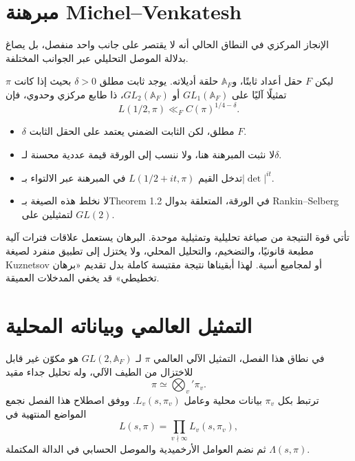 \section{مبرهنة Michel--Venkatesh}

الإنجاز المركزي في النطاق الحالي أنه لا يقتصر على جانب واحد منفصل، بل
يصاغ بدلالة الموصل التحليلي عبر الجوانب المختلفة.

\begin{theorem}
\label{thm:ch21-michel-venkatesh}
ليكن \(F\) حقل أعداد ثابتًا، و\(\mathbb A_F\) حلقة أديلاته. يوجد
ثابت مطلق \(\delta>0\) بحيث إذا كانت \(\pi\) تمثيلًا آليًا على
\(GL_1(\mathbb A_F)\) أو \(GL_2(\mathbb A_F)\)، ذا طابع مركزي
وحدوي، فإن
\[
L(1/2,\pi)
\ll_F
C(\pi)^{1/4-\delta}.
\]
\end{theorem}

\begin{remark}
\begin{itemize}
  \item \(\delta\) مطلق، لكن الثابت الضمني يعتمد على الحقل الثابت
  \(F\).
  \item لا نثبت المبرهنة هنا، ولا ننسب إلى الورقة قيمة عددية محسنة
  لـ\(\delta\).
  \item تدخل القيم \(L(1/2+it,\pi)\) في المبرهنة عبر الالتواء
  بـ\(|\det|^{it}\).
  \item لا نخلط هذه الصيغة بـTheorem 1.2 في الورقة، المتعلقة بدوال
  Rankin--Selberg لتمثيلين على \(GL(2)\).
\end{itemize}
\end{remark}

تأتي قوة النتيجة من صياغة تحليلية وتمثيلية موحدة. البرهان يستعمل علاقات
فترات آلية مطبعة قانونيًا، والتضخيم، والتحليل المحلي، ولا يختزل إلى
تطبيق منفرد لصيغة Kuznetsov أو لمجاميع أسية. لهذا أبقيناها نتيجة
مقتبسة كاملة بدل تقديم «برهان تخطيطي» قد يخفي المدخلات العميقة.

\section{التمثيل العالمي وبياناته المحلية}

\begin{definition}
\label{def:ch21-global-automorphic-representation}
في نطاق هذا الفصل، التمثيل الآلي العالمي \(\pi\) لـ
\(GL(2,\mathbb A_F)\) هو مكوّن غير قابل للاختزال من الطيف الآلي،
وله تحليل جداء مقيد
\[
\pi\simeq\bigotimes_v'\pi_v.
\]
ترتبط بكل \(\pi_v\) بيانات محلية وعامل \(L_v(s,\pi_v)\). ووفق
اصطلاح هذا الفصل نجمع المواضع المنتهية في
\[
L(s,\pi)=\prod_{v\nmid\infty}L_v(s,\pi_v),
\]
ثم نضم العوامل الأرخميدية والموصل الحسابي في الدالة المكتملة
\(\Lambda(s,\pi)\).
\end{definition}

